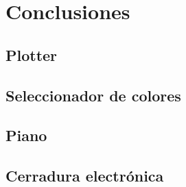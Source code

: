 
\section{Conclusiones}

\subsection{Plotter}

\subsection{Seleccionador de colores}

\subsection{Piano}

\subsection{Cerradura electrónica}
